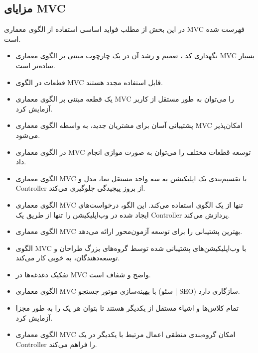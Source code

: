 \subsection{مزایای MVC}
در این بخش از مطلب فواید اساسی استفاده از الگوی معماری MVC فهرست شده است.
\begin{itemize}
	\item
	نگهداری کد
	، تعمیم و رشد آن در یک چارچوب مبتنی بر الگوی معماری MVC بسیار ساده‌تر است.
	\item
	قطعات در الگوی MVC‌ قابل استفاده مجدد هستند.
	\item
	یک قطعه مبتنی بر الگوی معماری MVC‌ را می‌توان به طور مستقل از کاربر آزمایش کرد.
	\item
	پشتیبانی آسان برای مشتریان جدید، به واسطه الگوی معماری MVC امکان‌پذیر می‌شود.
	\item
	در الگوی معماری MVC توسعه قطعات مختلف را می‌توان به صورت موازی انجام داد.
	\item
	الگوی معماری MVC با تقسیم‌بندی یک اپلیکیشن به سه واحد مستقل نما، مدل و Controller از بروز پیچیدگی جلوگیری می‌کند.
	\item
	الگوی معماری MVC تنها از یک الگوی
	 استفاده می‌کند. این الگو، درخواست‌های ایجاد شده در وب‌اپلیکیشن را تنها از طریق یک Controller پردازش می‌کند.
	\item
	الگوی معماری MVC بهترین پشتیبانی را برای توسعه آزمون‌محور
	 ارائه می‌دهد.
	\item
	الگوی MVC با وب‌اپلیکیشن‌های پشتیبانی شده توسط گروه‌های بزرگ طراحان و توسعه‌دهندگان، به خوبی کار می‌کند.
	\item
	تفکیک دغدغه‌ها
	 در MVC واضح و شفاف است.
	\item
	الگوی معماری MVC با بهینه‌سازی موتور جستجو (سئو | SEO) سازگاری دارد.
	\item
	تمام کلاس‌ها و اشیاء مستقل از یکدیگر هستند تا بتوان هر یک را به طور مجزا آزمایش کرد.
	\item
	الگوی معماری MVC امکان گروه‌بندی منطقی اعمال مرتبط با یکدیگر در یک Controller را فراهم می‌کند.
\end{itemize}

